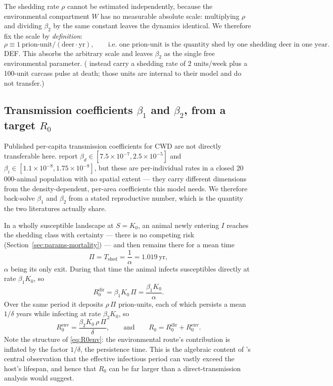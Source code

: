 \documentclass[11pt]{article}
\newcommand{\tagDEF}{{\footnotesize\textsf{\textcolor{blue!60!black}{DEF}}}}
\begin{document}
The shedding rate $\rho$ cannot be estimated independently, because the environmental compartment $W$ has no measurable absolute scale: multiplying $\rho$ and dividing $\beta_2$ by the same constant leaves the dynamics identical. We therefore fix the scale by \emph{definition}:
\begin{equation}
\rho \equiv 1\ \text{prion-unit}/(\text{deer}\cdot\text{yr}),
\qquad\text{i.e.\ one prion-unit is the quantity shed by one shedding deer in one year.}
\end{equation}
\tagDEF{}. This absorbs the arbitrary scale and leaves $\beta_2$ as the single free environmental parameter. (\citeauthor{Almberg2011} instead carry a shedding rate of 2 units/week plus a 100-unit carcass pulse at death; those units are internal to their model and do not transfer.)

\subsection{Transmission coefficients $\beta_1$ and $\beta_2$, from a target $R_0$}
\label{sec:params-r0}

Published per-capita transmission coefficients for CWD are not directly transferable here. \citet{Almberg2011} report $\beta_d \in [7.5\times10^{-7}, 2.5\times10^{-5}]$ and $\beta_i \in [1.1\times10^{-8}, 1.75\times10^{-8}]$, but these are per-individual rates in a closed 20\,000-animal population with no spatial extent --- they carry different dimensions from the density-dependent, per-area coefficients this model needs. We therefore back-solve $\beta_1$ and $\beta_2$ from a stated reproductive number, which is the quantity the two literatures actually share.

In a wholly susceptible landscape at $S=K_0$, an animal newly entering $I$ reaches the shedding class with certainty --- there is no competing risk (Section~\ref{sec:params-mortality}) --- and then remains there for a mean time
\begin{equation}
\Pi = T_{\text{shed}} = \frac{1}{\alpha} = 1.019\ \mathrm{yr},
\label{eq:Pi}
\end{equation}
$\alpha$ being its only exit. During that time the animal infects susceptibles directly at rate $\beta_1 K_0$, so
\begin{equation}
R_0^{\mathrm{dir}} = \beta_1 K_0\,\Pi = \frac{\beta_1 K_0}{\alpha}.
\label{eq:R0dir}
\end{equation}
Over the same period it deposits $\rho\,\Pi$ prion-units, each of which persists a mean $1/\delta$ years while infecting at rate $\beta_2 K_0$, so
\begin{equation}
R_0^{\mathrm{env}} = \frac{\beta_2 K_0\,\rho\,\Pi}{\delta},
\qquad\text{and}\qquad
R_0 = R_0^{\mathrm{dir}} + R_0^{\mathrm{env}}.
\label{eq:R0env}
\end{equation}
Note the structure of \eqref{eq:R0env}: the environmental route's contribution is inflated by the factor $1/\delta$, the persistence time. This is the algebraic content of \citeauthor{Almberg2011}'s central observation that the effective infectious period can vastly exceed the host's lifespan, and hence that $R_0$ can be far larger than a direct-transmission analysis would suggest.
\end{document}
